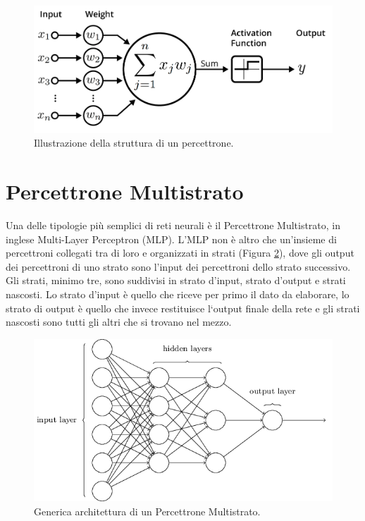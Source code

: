\begin{figure}[h!]
  \hspace*{0.3in}
  \includegraphics[scale=0.35]{img/neurone.png}
  \caption{Illustrazione della struttura di un percettrone.}
  \label{fig:perceptron}
\end{figure}














\section{Percettrone Multistrato}
Una delle tipologie più semplici di reti neurali è il Percettrone Multistrato, in inglese Multi-Layer Perceptron (MLP). L’MLP non è altro che un’insieme di percettroni collegati tra di loro e organizzati in strati (Figura \ref{fig:MLP}), dove gli output dei percettroni di uno strato sono l’input dei percettroni dello strato successivo. Gli strati, minimo tre, sono suddivisi in strato d’input, strato d’output e strati nascosti. Lo strato d’input è quello che riceve per primo il dato da elaborare, lo strato di output è quello che invece restituisce  l‘output finale della rete e  gli strati nascosti sono tutti gli altri che si trovano nel mezzo.\\

\begin{figure}[h!]
  \includegraphics[scale=0.6]{img/MLP.png}
  \caption{Generica architettura di un Percettrone Multistrato.}
  \label{fig:MLP}
\end{figure}

